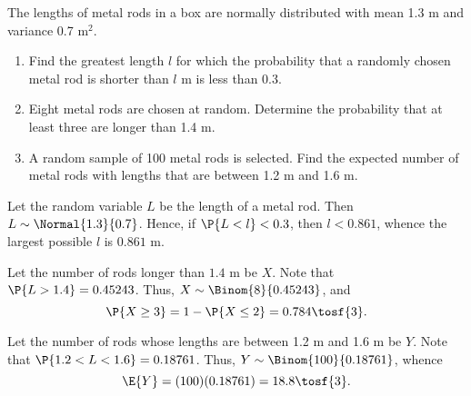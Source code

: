 \begin{problem}
    The lengths of metal rods in a box are normally distributed with mean 1.3 m and variance 0.7 m$^{2}$.

    \begin{enumerate}
        \item Find the greatest length $l$ for which the probability that a randomly chosen metal rod is shorter than $l$ m is less than 0.3.
        \item Eight metal rods are chosen at random. Determine the probability that at least three are longer than 1.4 m.
        \item A random sample of 100 metal rods is selected. Find the expected number of metal rods with lengths that are between 1.2 m and 1.6 m.
    \end{enumerate}
\end{problem}
\begin{solution}
    \begin{ppart}
        Let the random variable $L$ be the length of a metal rod. Then $L \sim \Normal{1.3}{0.7}$. Hence, if $\P{L < l} < 0.3$, then $l < 0.861$, whence the largest possible $l$ is $0.861$ m.
    \end{ppart}
    \begin{ppart}
        Let the number of rods longer than $1.4$ m be $X$. Note that $\P{L > 1.4} = 0.45243$. Thus, $X \sim \Binom{8}{0.45243}$, and \[\P{X \geq 3} = 1 - \P{X \leq 2} = 0.784 \tosf{3}.\]
    \end{ppart}
    \begin{ppart}
        Let the number of rods whose lengths are between 1.2 m and 1.6 m be $Y$. Note that $\P{1.2 < L < 1.6} = 0.18761$. Thus, $Y \sim \Binom{100}{0.18761}$, whence \[\E{Y} = (100)(0.18761) = 18.8 \tosf{3}.\]
    \end{ppart}
\end{solution}

